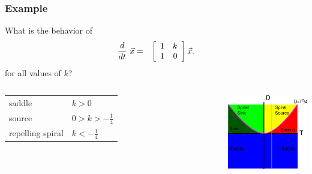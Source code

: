 \begin{frame}
  \frametitle{Example}

  What is the behavior of
  \begin{eqnarray*}
    \deriv{~}{t} \vec{x} & = & \arrayTwo{1}{k}{1}{0} \vec{x}.
  \end{eqnarray*}
  for all values of $k$?

      \begin{columns}
        \begin{tabular}{ll}
          saddle           & $k>0$\\
          source           & $0 > k  > -\frac{1}{4}$ \\
          repelling spiral & $k < -\frac{1}{4}$
        \end{tabular}

        \centerline{\includegraphics[width=5cm]{img/traceDeterminantExample3}}
      \end{columns}


\end{frame}

